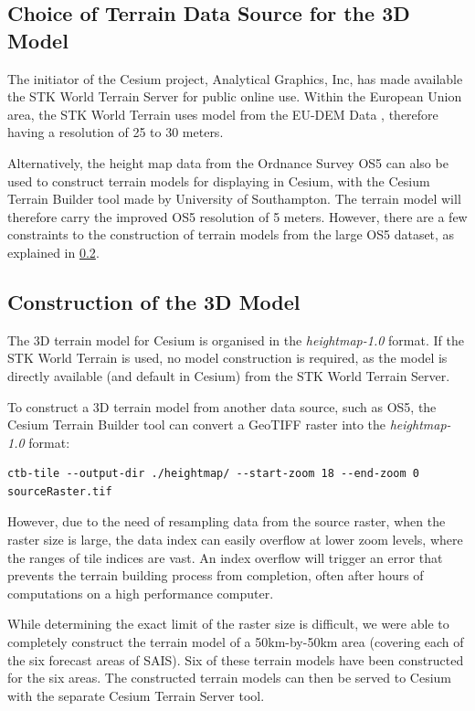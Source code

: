 \documentclass[11pt, oneside]{article}
\begin{document}
	\subsection{Choice of Terrain Data Source for the 3D Model}
	
	 	The initiator of the Cesium project, Analytical Graphics, Inc, has made available the STK World Terrain Server \cite{stk-world-terrain} for public online use. Within the European Union area, the STK World Terrain uses model from the EU-DEM Data \cite{eu-dem}, therefore having a resolution of 25 to 30 meters. 
		
		Alternatively, the height map data from the Ordnance Survey OS5 \cite{os-5} can also be used to construct terrain models for displaying in Cesium, with the Cesium Terrain Builder \cite{cesium-terrain-builder} tool made by University of Southampton. The terrain model will therefore carry the improved OS5 resolution of 5 meters. However, there are a few constraints to the construction of terrain models from the large OS5 dataset, as explained in \ref{subsec:construction}.
		
	\subsection{Construction of the 3D Model} \label{subsec:construction}
		
		The 3D terrain model for Cesium is organised in the \textit{heightmap-1.0}\cite{heightmap} format. If the STK World Terrain is used, no model construction is required, as the model is directly available (and default in Cesium) from the STK World Terrain Server. 
		
		To construct a 3D terrain model from another data source, such as OS5, the Cesium Terrain Builder tool can convert a GeoTIFF raster into the \textit{heightmap-1.0} format:
		\begin{lstlisting}[breaklines]
ctb-tile --output-dir ./heightmap/ --start-zoom 18 --end-zoom 0 sourceRaster.tif
		\end{lstlisting}
		
		However, due to the need of resampling data from the source raster, when the raster size is large, the data index can easily overflow at lower zoom levels, where the ranges of tile indices are vast.  An index overflow will trigger an error that prevents the terrain building process from completion, often after hours of computations on a high performance computer. 
		
		While determining the exact limit of the raster size is difficult, we were able to completely construct the terrain model of a 50km-by-50km area (covering each of the six forecast areas of SAIS). Six of these terrain models have been constructed for the six areas. The constructed terrain models can then be served to Cesium with the separate Cesium Terrain Server \cite{cesium-terrain-server} tool.
		
\end{document}
